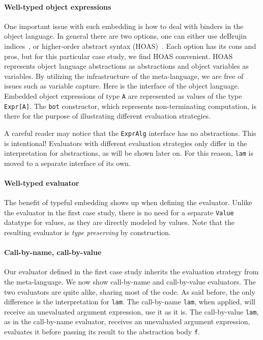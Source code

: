 \paragraph{Well-typed object expressions} One important issue with such
embedding is how to deal with binders in the object language. In general there
are two options, one can either use deBrujin indices~\cite{}, or higher-order
abstract syntax (HOAS)~\cite{}. Each option has its cons and pros, but for this
particular case study, we find HOAS convenient. HOAS represents object language
abstractions as \name abstractions and object variables as \name variables. By
utilizing the infrastructure of the meta-language, we are free of issues such as
variable capture. Here is the interface of the object language.
Embedded object expressions of type \lstinline{A} are represented as \name
values of the type \lstinline{Expr[A]}. The \lstinline{bot} constructor, which
represents non-terminating computation, is there for the purpose of illustrating
different evaluation strategies.

A careful reader may notice that the \lstinline{ExprAlg} interface has no
abstractions. This is intentional! Evaluators with different evaluation
strategies only differ in the interpretation for abstractions, as will be shown
later on. For this reason, \lstinline{lam} is moved to a separate interface of
its own.


\paragraph{Well-typed evaluator}
The benefit of typeful embedding shows up when defining the evaluator.
Unlike the evaluator in the first case study, there is no need for a separate
\lstinline{Value} datatype for values, as they are directly modeled by \name
values. Note that the resulting evaluator is \textit{type preserving} by
construction.

\paragraph{Call-by-name, call-by-value}
Our evaluator defined in the first case study inherits the evaluation strategy
from the meta-language. We now show call-by-name and call-by-value evaluators.
The two evaluators are quite alike, sharing most of the code. As said before,
the only difference is the interpretation for \lstinline{lam}.
The call-by-name \lstinline{lam}, when applied, will receive an unevaluated
argument expression, use it as it is. The call-by-value \lstinline{lam}, as in
the call-by-name evaluator, receives an unevaluated argument expression,
evaluates it before passing its result to the abstraction body \lstinline{f}.

